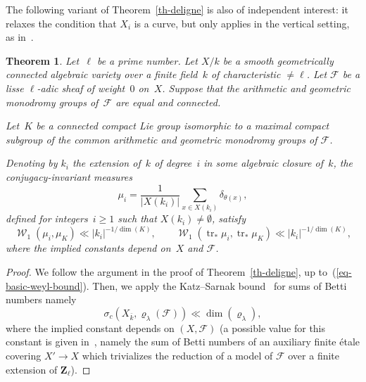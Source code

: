 \documentclass[12pt]{amsart}
\renewcommand{\mathcal}{\mathscr}
\renewcommand{\geq}{\geqslant}
\newcommand{\Zz}{\mathbf{Z}}
\DeclareMathOperator{\wass}{\mathcal{W}}
\DeclareMathOperator{\Tr}{tr}
\renewcommand{\rho}{\varrho}
\theoremstyle{plain}
\newtheorem{theorem}{Theorem}[section]
\theoremstyle{remark}
\theoremstyle{definition}
\renewcommand{\geq}{\geqslant}
\begin{document}
The following variant of Theorem~\ref{th-deligne} is also of
independent interest: it relaxes the condition that $X_i$ is a curve,
but only applies in the vertical setting, as in~\cite{fulauxi}.

\begin{theorem}\label{th-deligne2}
  Let~$\ell$ be a prime number.  Let $X/k$ be a smooth geometrically
  connected algebraic variety over a finite field~$k$ of characteristic
  $\not=\ell$. Let $\mathcal{F}$ be a lisse $\ell$-adic sheaf of
  weight~$0$ on~$X$. Suppose that the arithmetic and geometric monodromy
  groups of~$\mathcal{F}$ are equal and connected.

  Let~$K$ be a connected compact Lie group isomorphic to a maximal
  compact subgroup of the common arithmetic and geometric monodromy
  groups of $\mathcal{F}$.

  Denoting by $k_i$ the extension of~$k$ of degree~$i$ in some algebraic
  closure of~$k$, the conjugacy-invariant measures
  \[
    \mu_i=\frac{1}{|X(k_i)|} \sum_{x\in X(k_i)}\delta_{\theta(x)},
  \]
  defined for integers~$i\geq 1$ such that $X(k_i)\not=\emptyset$,
  satisfy
  \begin{equation}\label{eq-deligne2}
    \wass_1(\mu_i,\mu_K)\ll |k_i|^{-1/\dim(K)}, \quad\quad
    \wass_1(\Tr_*\mu_i,\Tr_*\mu_K)\ll |k_i|^{-1/\dim(K)},
  \end{equation}
  where the implied constants depend on~$X$ and $\mathcal{F}$.
\end{theorem}

\begin{proof}
  We follow the argument in the proof of Theorem~\ref{th-deligne}, up
  to~(\ref{eq-basic-weyl-bound}). Then, we apply the Katz--Sarnak
  bound~\cite[Th.\,9.2.6,\,(3)]{katz-sarnak} for sums of Betti numbers
  namely
  \[
    \sigma_c(X_{\bar{k}},\rho_{\lambda}(\mathcal{F}))\ll \dim(\rho_{\lambda}),
  \]
  where the implied constant depends on $(X,\mathcal{F})$ (a possible
  value for this constant is given
  in~\cite[loc.\,cit.\,,\,(4)]{katz-sarnak}, namely the sum of Betti
  numbers of an auxiliary finite étale covering $X'\to X$ which
  trivializes the reduction of a model of $\mathcal{F}$ over a finite
  extension of $\Zz_{\ell}$).
\end{proof}
\end{document}
